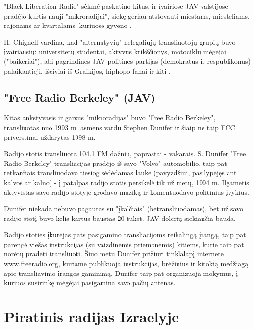 \documentclass[kursinis-darbas]{vukf}
\begin{document}
"Black Liberation Radio" sėkmė paskatino kitus, ir įvairiose JAV valstijose pradėjo kurtis nauji "mikroradijai", siekę geriau atstovauti miestams, miesteliams, rajonams ar kvartalams, kuriuose gyveno \cite[p.~135]{hc_key_concepts_in_radio_studies}.

H. Chignell vardina, kad "alternatyvių" nelegaliųjų transliuotojų grupių buvo įvairiausių: universitetų studentai, aktyvūs krikščionys, motociklų mėgėjai ("baikeriai"), abi pagrindines JAV politines partijas (demokratus ir respublikonus) palaikantieji, išeiviai iš Graikijos, hiphopo fanai ir kiti \cite[p.~136]{hc_key_concepts_in_radio_studies}.


\subsection{"Free Radio Berkeley" (JAV)}

Kitas ankstyvasis ir garsus "mikroradijas" buvo "Free Radio Berkeley", transliuotas nuo 1993 m. asmens vardu Stephen Dunifer ir šiaip ne taip \gls{FCC} priverstinai uždarytas 1998 m. \cite[p.~6]{tmc_fcc_enforcement_difficulties_with_unlicensed_micro_radio}

Radijo stotis transliuota 104.1 FM dažniu, paprastai - vakarais. S. Dunifer "Free Radio Berkeley" transliacijas pradėjo iš savo "Volvo" automobilio, taip pat retkarčiais transliuodavo tiesiog sėdėdamas lauke (pavyzdžiui, pasilypėjęs ant kalvos ar kalno) - į patalpas radijo stotis persikėlė tik už metų, 1994 m. Ilgametis aktyvistas savo radijo stotyje grodavo muziką ir komentuodavo politinius įvykius.

Dunifer niekada nebuvo pagautas su "įkalčiais" (betransliuodamas), bet už savo radijo stotį buvo kelis kartus baustas 20 tūkst. JAV dolerių siekiančia bauda.

Radijo stoties įkūrėjas pats pasigamino transliacijoms reikalingą įrangą, taip pat parengė viešas instrukcijas (su vaizdinėmis priemonėmis) kitiems, kurie taip pat norėtų pradėti transliuoti. Šiuo metu Dunifer prižiūri tinklalapį internete \url{www.freeradio.org}, kuriame publikuoja instrukcijas, brėžinius ir kitokią medžiagą apie transliavimo įrangos gaminimą. Dunifer taip pat organizuoja mokymus, į kuriuos susirinkę mėgėjai pasigamina savo pačių antenas.


\section{Piratinis radijas Izraelyje}
\end{document}
